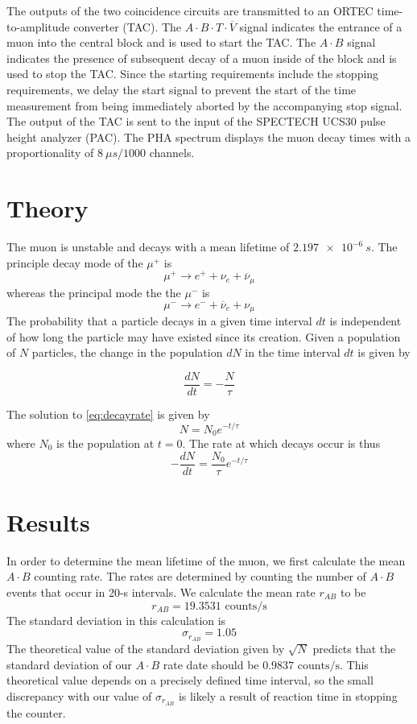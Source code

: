 \documentclass[aps, reprint,amsmath,amssymb]{revtex4-1} %
\begin{document}
The outputs of the two coincidence circuits are transmitted to an ORTEC time-to-amplitude converter (TAC). The $A \cdot B \cdot T \cdot \overline{V}$ signal indicates the entrance of a muon into the central block and is used to start the TAC. The $A \cdot B$ signal indicates the presence of subsequent decay of a muon inside of the block and is used to stop the TAC. Since the starting requirements include the stopping requirements, we delay the start signal to prevent the start of the time measurement from being immediately aborted by the accompanying stop signal. The output of the TAC is sent to the input of the SPECTECH UCS30 pulse height analyzer (PAC). The PHA spectrum displays the muon decay times with a proportionality of $\SI{8}{\mu s}/1000$ channels.

\section{Theory}

The muon is unstable and decays with a mean lifetime of $\SI{2.197e-6}{s}$. The principle decay mode of the $\mu^+$ is
\[
	\mu^+ \rightarrow e^+ + \nu_e + \overline{\nu}_{\mu}
\]
whereas the principal mode the the $\mu^-$ is
\[
	\mu^- \rightarrow e^- + \overline{\nu}_e + \nu_{\mu}
\]
The probability that a particle decays in a given time interval $dt$ is independent of how long the particle may have existed since its creation. Given a population of $N$ particles, the change in the population $dN$ in the time interval $dt$ is given by

\begin{equation} \label{eq:decayrate}
    \frac{dN}{dt} = - \frac{N}{\tau}
\end{equation}

The solution to \eqref{eq:decayrate} is given by
\[
	N = N_0 e^{-t/\tau}
\]
where $N_0$ is the population at $t=0$. The rate at which decays occur is thus
\[
	-\frac{dN}{dt} = \frac{N_0}{\tau} e^{-t/\tau}
\]


\section{Results}

In order to determine the mean lifetime of the muon, we first calculate the mean $A \cdot B$ counting rate. The rates are determined by counting the number of $A \cdot B$ events that occur in 20-s intervals. We calculate the mean rate $r_{AB}$ to be
\[
	r_{AB} = 19.3531 \text{ counts}/\text{s}
\]
The standard deviation in this calculation is
\[
	\sigma_{r_{AB}} = 1.05 
\]
The theoretical value of the standard deviation given by $\sqrt{N}$ predicts that the standard deviation of our $A \cdot B$ rate date should be $0.9837 \text{ counts}/\text{s}$. This theoretical value depends on a precisely defined time interval, so the small discrepancy with our value of $\sigma_{r_{AB}}$ is likely a result of reaction time in stopping the counter. 
\end{document}
